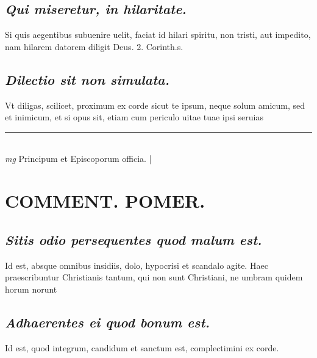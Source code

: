 \documentclass{article}
\begin{document}
\begin{pages}
\subsection*{\textit{Qui miseretur, in hilaritate. }}\pstart Si quis aegentibus subuenire uelit, faciat id hilari spiritu, non tristi, aut impedito, nam hilarem datorem diligit Deus. 2. Corinth.s.  \pend
{}
{}
\subsection*{\textit{Dilectio sit non simulata. }}\pstart Vt diligas, scilicet, proximum ex corde sicut te ipsum, neque solum amicum, sed et inimicum, et si opus sit, etiam cum periculo uitae tuae ipsi seruias  \pend
\vspace{0.5cm}\noindent
\vspace{0.2cm}\rule{1cm}{0.2pt}\\ 
\hspace{0.2cm}\textit{mg}
\footnotesize Principum et Episcoporum officia.  
\normalsize| 
\section*{COMMENT. POMER.  }
{}
\subsection*{\textit{Sitis odio persequentes quod malum est. }}\pstart Id est, absque omnibus insidiis, dolo, hypocrisi et scandalo agite. Haec praescribuntur Christianis tantum, qui non sunt Christiani, ne umbram quidem horum norunt  \pend
{}
{}
\subsection*{\textit{Adhaerentes ei quod bonum est. }}\pstart Id est, quod integrum, candidum et sanctum est, complectimini ex corde.  \pend
{}
{}

\end{pages}
\end{document}
